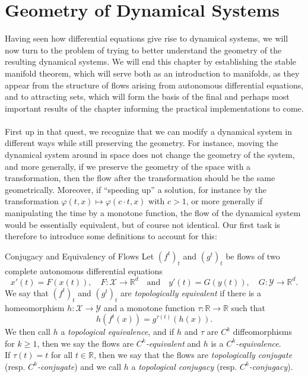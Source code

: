 \documentclass[11pt, a4paper]{memoir}
\theoremstyle{break}
\theoremstyle{break}
\theoremstyle{nonumberplain}
\newcommand{\mR}{\mathbb{R}}
\begin{document}
\section{Geometry of Dynamical Systems}
Having seen how differential equations give rise to dynamical systems, we will now turn to the problem of trying to better understand the geometry of the  resulting dynamical systems. We will end this chapter by establishing the stable manifold theorem, which will serve both as an introduction to manifolds, as they appear from the structure of flows arising from autonomous differential equations, and to attracting sets, which will form the basis of the final and perhaps most important results of the chapter informing the practical implementations to come.\\\\
First up in that quest, we recognize that we can modify a dynamical system in different ways while still preserving the geometry. For instance, moving the dynamical system around in space does not change the geometry of the system, and more generally, if we preserve the geometry of the space with a transformation, then the flow after the transformation should be the same geometrically. Moreover, if \enquote{speeding up} a solution, for instance by the transformation $\varphi(t,x)\mapsto\varphi(c\cdot t,x)$ with $c>1$, or  more generally if manipulating the time by a monotone function, the flow of the dynamical system would be essentially equivalent, but of course not identical. Our first task is therefore to introduce some definitions to account for this:
\begin{mydefinition}{Conjugacy and Equivalency of Flows}
Let $(f^t)_t$ and $(g^t)_t$ be flows of two complete autonomous differential equations
$$x'(t)=F(x(t)), \quad F:\mathcal{X}\to\mR^d\quad\text{and}\quad y'(t)=G(y(t)),\quad G:\mathcal{Y}\to\mR^d.$$
We say that $(f^t)_t$ and $(g^t)_t$ are \emph{topologically equivalent} if there is a homeomorphism $h:\mathcal{X}\to\mathcal{Y}$ and a monotone function $\tau:\mR\to\mR$ such that
$$h(f^t(x))=g^{\tau(t)}(h(x)).$$
We then call $h$ a \emph{topological equivalence}, and if $h$ and $\tau$ are $C^k$ diffeomorphisms for $k\geqslant 1$, then we say the flows are \emph{$C^k$-equivalent} and $h$ is a \emph{$C^k$-equivalence}.\\[5pt]
If $\tau(t)=t$ for all $t\in \mR$, then we say that the flows are \emph{topologically conjugate} (resp. \emph{$C^k$-conjugate}) and we call $h$ a \emph{topological conjugacy} (resp. \emph{$C^k$-conjugacy}).
\end{mydefinition}
\end{document}
